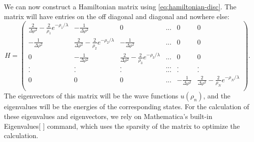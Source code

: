 \documentclass[12pt,twoside]{reedthesis}
\begin{document}
We can now construct a Hamiltonian matrix using \eqref{eq:hamiltonian-disc}. The matrix will have entries on the off diagonal and diagonal and nowhere else:
\begin{equation*}H = \left(
\begin{array}{cccccc}
\frac{2} {\Delta \rho^2} -  \frac{2}{\rho_1}e^{-\rho_1/\lambda} & -\frac{1}{\Delta \rho^2} &  0 & ... & 0 & 0 \\
-\frac{1}{\Delta \rho^2} & \frac{2} {\Delta \rho^2} -  \frac{2}{\rho_2}e^{-\rho_2/\lambda} &  -\frac{1}{\Delta \rho^2}  & ... & 0 & 0 \\
0 &  -\frac{1}{\Delta \rho^2} & \frac{2} {\Delta \rho^2} -  \frac{2}{\rho_3}e^{-\rho_3/\lambda} &  ...  & 0 & 0 \\
 .&  . &.  &... & .& .  \\
 .& . & . & ...& .&  . \\
0 & 0 &  0 & ...&  -\frac{1}{\Delta \rho^2} & \frac{2} {\Delta \rho^2} -  \frac{2}{\rho_N}e^{-\rho_N/\lambda}   \\
\end{array}
\right)\mbox{.}
\end{equation*}
The eigenvectors of this matrix will be the wave functions $u(\rho_n)$, and the eigenvalues will be the energies of the corresponding states. For the calculation of these eigenvalues and eigenvectors, we rely on Mathematica's built-in Eigenvalues[ ] command, which uses the sparsity of the matrix to optimize the calculation. 
\end{document}
